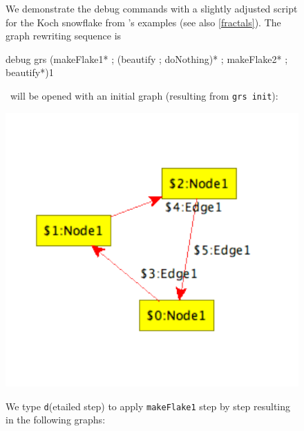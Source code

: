 \begin{figure}[htbp]
\begin{example}\label{ex:debug}  
We demonstrate the debug commands with a slightly adjusted script for the Koch snowflake from \GrG's examples (see also \ref{fractals}). The graph rewriting sequence is
\begin{grshell}
debug grs (makeFlake1* ; (beautify ; doNothing)* ; makeFlake2* ; beautify*){1}
\end{grshell}
\yComp\ will be opened with an initial graph (resulting from \texttt{grs init}):
\begin{center}
  \includegraphics[width=0.3\linewidth]{fig/debug0tra}
\end{center}
We type \texttt{d}(etailed step) to apply \texttt{makeFlake1} step by step resulting in the following graphs:
\begin{center}

\end{center}
\end{example}
\end{figure}
